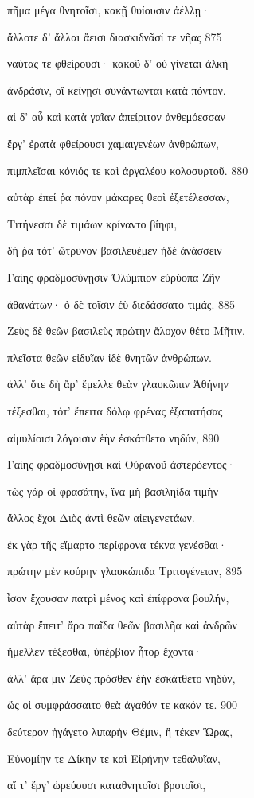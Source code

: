 πῆμα μέγα θνητοῖσι, κακῇ θυίουσιν ἀέλλῃ· 

ἄλλοτε δ' ἄλλαι ἄεισι διασκιδνᾶσί τε νῆας \num{875}

ναύτας τε φθείρουσι· κακοῦ δ' οὐ γίνεται ἀλκὴ 

ἀνδράσιν, οἳ κείνῃσι συνάντωνται κατὰ πόντον. 

αἱ δ' αὖ καὶ κατὰ γαῖαν ἀπείριτον ἀνθεμόεσσαν

ἔργ' ἐρατὰ φθείρουσι χαμαιγενέων ἀνθρώπων, 

πιμπλεῖσαι κόνιός τε καὶ ἀργαλέου κολοσυρτοῦ. \num{880}

αὐτὰρ ἐπεί ῥα πόνον μάκαρες θεοὶ ἐξετέλεσσαν, 

Τιτήνεσσι δὲ τιμάων κρίναντο βίηφι,

δή ῥα τότ' ὤτρυνον βασιλευέμεν ἠδὲ ἀνάσσειν

Γαίης φραδμοσύνῃσιν Ὀλύμπιον εὐρύοπα Ζῆν

ἀθανάτων· ὁ δὲ τοῖσιν ἐὺ διεδάσσατο τιμάς. \num{885}

Ζεὺς δὲ θεῶν βασιλεὺς πρώτην ἄλοχον θέτο Μῆτιν, 

πλεῖστα θεῶν εἰδυῖαν ἰδὲ θνητῶν ἀνθρώπων. 

ἀλλ' ὅτε δὴ ἄρ' ἔμελλε θεὰν γλαυκῶπιν Ἀθήνην

τέξεσθαι, τότ' ἔπειτα δόλῳ φρένας ἐξαπατήσας

αἱμυλίοισι λόγοισιν ἑὴν ἐσκάτθετο νηδύν, \num{890} 

Γαίης φραδμοσύνῃσι καὶ Οὐρανοῦ ἀστερόεντος· 

τὼς γάρ οἱ φρασάτην, ἵνα μὴ βασιληίδα τιμὴν

ἄλλος ἔχοι Διὸς ἀντὶ θεῶν αἰειγενετάων.

ἐκ γὰρ τῆς εἵμαρτο περίφρονα τέκνα γενέσθαι· 

πρώτην μὲν κούρην γλαυκώπιδα Τριτογένειαν, \num{895}

ἶσον ἔχουσαν πατρὶ μένος καὶ ἐπίφρονα βουλήν,

αὐτὰρ ἔπειτ' ἄρα παῖδα θεῶν βασιλῆα καὶ ἀνδρῶν

ἤμελλεν τέξεσθαι, ὑπέρβιον ἦτορ ἔχοντα·

ἀλλ' ἄρα μιν Ζεὺς πρόσθεν ἑὴν ἐσκάτθετο νηδύν,

ὥς οἱ συμφράσσαιτο θεὰ ἀγαθόν τε κακόν τε. \num{900}

δεύτερον ἠγάγετο λιπαρὴν Θέμιν, ἣ τέκεν Ὥρας,

Εὐνομίην τε Δίκην τε καὶ Εἰρήνην τεθαλυῖαν,

αἵ τ' ἔργ' ὠρεύουσι καταθνητοῖσι βροτοῖσι,

